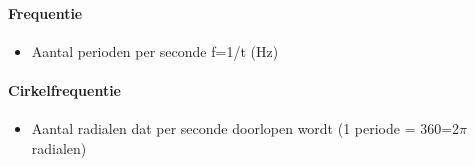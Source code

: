 \documentclass[12pt]{article}
\begin{document}
\begin{itemize}
\begin{itemize}
\paragraph{Frequentie}
\begin{itemize}
    \item Aantal perioden per seconde f=1/t (Hz)
\end{itemize}
\paragraph{Cirkelfrequentie}
\begin{itemize}
    \item Aantal radialen dat per seconde doorlopen wordt (1 periode = 360\textdegree{}=2$\pi$ radialen)
\end{itemize}
\end{itemize}
\end{itemize}
\end{document}
